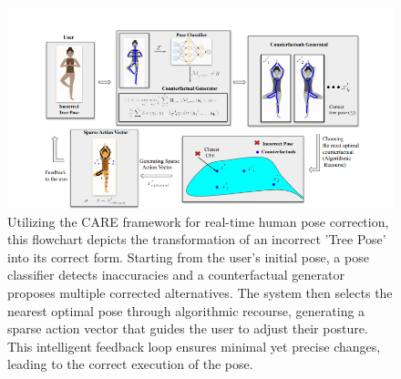 \begin{figure}[H] %
  \centering %
  \includegraphics[width=\textwidth]{Images/image4.png}
  \caption{Utilizing the CARE framework for real-time human pose correction, this flowchart depicts the transformation of an incorrect 'Tree Pose' into its correct form. Starting from the user's initial pose, a pose classifier detects inaccuracies and a counterfactual generator proposes multiple corrected alternatives. The system then selects the nearest optimal pose through algorithmic recourse, generating a sparse action vector that guides the user to adjust their posture. This intelligent feedback loop ensures minimal yet precise changes, leading to the correct execution of the pose.}
  \label{fig:tree-pose-correction} %
\end{figure}
\newline
